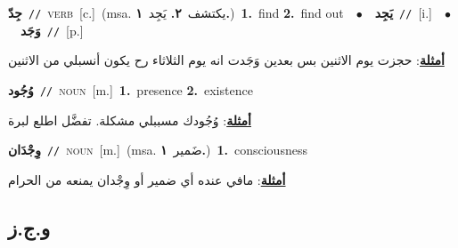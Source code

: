 \documentclass[10pt,a4paper,twoside]{article} %
\begin{document}
\begin{multicols}{2}
{{{{{{{{{{\setlength\topsep{0pt}\textbf{\foreignlanguage{arabic}{جِدّ}}\ {\color{gray}\texttt{//}\color{black}}\ \textsc{verb}\ [c.]\ \color{gray}(msa. \foreignlanguage{arabic}{يكتشف}~\foreignlanguage{arabic}{\textbf{٢.}}  \foreignlanguage{arabic}{يَجِد}~\foreignlanguage{arabic}{\textbf{١.}})\color{black}\ \textbf{1.}~find  \textbf{2.}~find out\ \ $\bullet$\ \ \setlength\topsep{0pt}\textbf{\foreignlanguage{arabic}{يَجِد}}\ {\color{gray}\texttt{//}\color{black}}\ [i.]\ \ $\bullet$\ \ \setlength\topsep{0pt}\textbf{\foreignlanguage{arabic}{وَجَد}}\ {\color{gray}\texttt{//}\color{black}}\ [p.]\  \begin{flushright}\color{gray}\foreignlanguage{arabic}{\textbf{\underline{\foreignlanguage{arabic}{أمثلة}}}: حجزت يوم الاثنين بس بعدين وَجَدت انه يوم الثلاثاء رح يكون أنسبلي من الاثنين}\end{flushright}\color{black}} \vspace{2mm}

{\setlength\topsep{0pt}\textbf{\foreignlanguage{arabic}{وُجُود}}\ {\color{gray}\texttt{//}\color{black}}\ \textsc{noun}\ [m.]\ \textbf{1.}~presence  \textbf{2.}~existence\  \begin{flushright}\color{gray}\foreignlanguage{arabic}{\textbf{\underline{\foreignlanguage{arabic}{أمثلة}}}: وُجُودك مسببلي مشكلة. تفضَّل اطلع لبرة}\end{flushright}\color{black}} \vspace{2mm}

{\setlength\topsep{0pt}\textbf{\foreignlanguage{arabic}{وِجْدَان}}\ {\color{gray}\texttt{//}\color{black}}\ \textsc{noun}\ [m.]\ \color{gray}(msa. \foreignlanguage{arabic}{ضَمير}~\foreignlanguage{arabic}{\textbf{١.}})\color{black}\ \textbf{1.}~consciousness\  \begin{flushright}\color{gray}\foreignlanguage{arabic}{\textbf{\underline{\foreignlanguage{arabic}{أمثلة}}}: مافي عنده أي ضمير أو وِجْدان يمنعه من الحرام}\end{flushright}\color{black}} \vspace{2mm}

\vspace{-3mm}
\subsection*{\color{blue}\foreignlanguage{arabic}{و.ج.ز}\color{blue}{}} 

}}}}}}}}}
\end{multicols}
\end{document}
